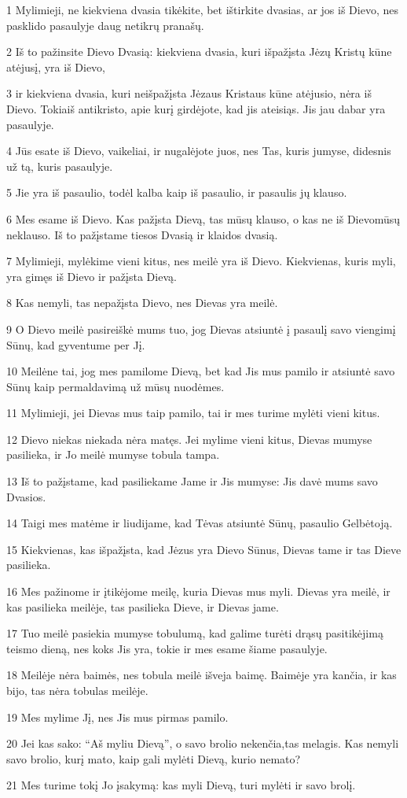\par 1 Mylimieji, ne kiekviena dvasia tikėkite, bet ištirkite dvasias, ar jos iš Dievo, nes pasklido pasaulyje daug netikrų pranašų. 
\par 2 Iš to pažinsite Dievo Dvasią: kiekviena dvasia, kuri išpažįsta Jėzų Kristų kūne atėjusį, yra iš Dievo, 
\par 3 ir kiekviena dvasia, kuri neišpažįsta Jėzaus Kristaus kūne atėjusio, nėra iš Dievo. Tokia­iš antikristo, apie kurį girdėjote, kad jis ateisiąs. Jis jau dabar yra pasaulyje. 
\par 4 Jūs esate iš Dievo, vaikeliai, ir nugalėjote juos, nes Tas, kuris jumyse, didesnis už tą, kuris pasaulyje. 
\par 5 Jie yra iš pasaulio, todėl kalba kaip iš pasaulio, ir pasaulis jų klauso. 
\par 6 Mes esame iš Dievo. Kas pažįsta Dievą, tas mūsų klauso, o kas ne iš Dievo­mūsų neklauso. Iš to pažįstame tiesos Dvasią ir klaidos dvasią. 
\par 7 Mylimieji, mylėkime vieni kitus, nes meilė yra iš Dievo. Kiekvienas, kuris myli, yra gimęs iš Dievo ir pažįsta Dievą. 
\par 8 Kas nemyli, tas nepažįsta Dievo, nes Dievas yra meilė. 
\par 9 O Dievo meilė pasireiškė mums tuo, jog Dievas atsiuntė į pasaulį savo viengimį Sūnų, kad gyventume per Jį. 
\par 10 Meilė­ne tai, jog mes pamilome Dievą, bet kad Jis mus pamilo ir atsiuntė savo Sūnų kaip permaldavimą už mūsų nuodėmes. 
\par 11 Mylimieji, jei Dievas mus taip pamilo, tai ir mes turime mylėti vieni kitus. 
\par 12 Dievo niekas niekada nėra matęs. Jei mylime vieni kitus, Dievas mumyse pasilieka, ir Jo meilė mumyse tobula tampa. 
\par 13 Iš to pažįstame, kad pasiliekame Jame ir Jis mumyse: Jis davė mums savo Dvasios. 
\par 14 Taigi mes matėme ir liudijame, kad Tėvas atsiuntė Sūnų, pasaulio Gelbėtoją. 
\par 15 Kiekvienas, kas išpažįsta, kad Jėzus yra Dievo Sūnus, Dievas tame ir tas Dieve pasilieka. 
\par 16 Mes pažinome ir įtikėjome meilę, kuria Dievas mus myli. Dievas yra meilė, ir kas pasilieka meilėje, tas pasilieka Dieve, ir Dievas jame. 
\par 17 Tuo meilė pasiekia mumyse tobulumą, kad galime turėti drąsų pasitikėjimą teismo dieną, nes koks Jis yra, tokie ir mes esame šiame pasaulyje. 
\par 18 Meilėje nėra baimės, nes tobula meilė išveja baimę. Baimėje yra kančia, ir kas bijo, tas nėra tobulas meilėje. 
\par 19 Mes mylime Jį, nes Jis mus pirmas pamilo. 
\par 20 Jei kas sako: “Aš myliu Dievą”, o savo brolio nekenčia,­tas melagis. Kas nemyli savo brolio, kurį mato, kaip gali mylėti Dievą, kurio nemato? 
\par 21 Mes turime tokį Jo įsakymą: kas myli Dievą, turi mylėti ir savo brolį.


